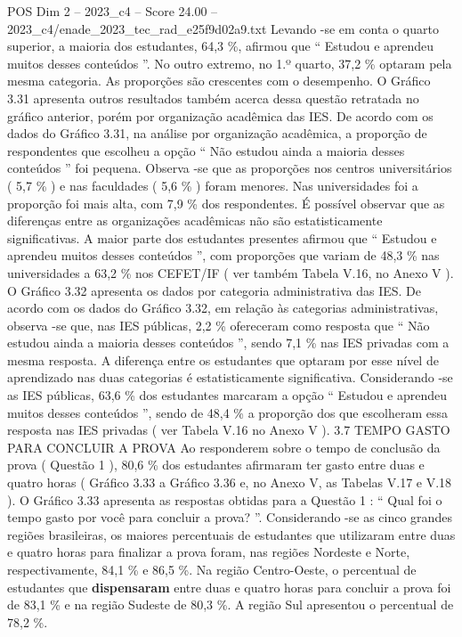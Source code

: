 \begin{textsample}{POS Dim 2 – 2023\_c4 – Score 24.00 – 2023\_c4/enade\_2023\_tec\_rad\_e25f9d02a9.txt}
Levando -se em conta o quarto superior, a maioria dos estudantes, 64,3 \%, afirmou que “ Estudou e aprendeu muitos desses conteúdos ”.
No outro extremo, no 1.º quarto, 37,2 \% optaram pela mesma categoria.
As proporções são crescentes com o desempenho.
O Gráfico 3.31 apresenta outros resultados também acerca dessa questão retratada no gráfico anterior, porém por organização acadêmica das IES.
De acordo com os dados do Gráfico 3.31, na análise por organização acadêmica, a proporção de respondentes que escolheu a opção “ Não estudou ainda a maioria desses conteúdos ” foi pequena.
Observa -se que as proporções nos centros universitários ( 5,7 \% ) e nas faculdades ( 5,6 \% ) foram menores.
Nas universidades foi a proporção foi mais alta, com 7,9 \% dos respondentes.
É possível observar que as diferenças entre as organizações acadêmicas não são estatisticamente significativas.
A maior parte dos estudantes presentes afirmou que “ Estudou e aprendeu muitos desses conteúdos ”, com proporções que variam de 48,3 \% nas universidades a 63,2 \% nos CEFET/IF ( ver também Tabela V.16, no Anexo V ).
O Gráfico 3.32 apresenta os dados por categoria administrativa das IES.
De acordo com os dados do Gráfico 3.32, em relação às categorias administrativas, observa -se que, nas IES públicas, 2,2 \% ofereceram como resposta que “ Não estudou ainda a maioria desses conteúdos ”, sendo 7,1 \% nas IES privadas com a mesma resposta.
A diferença entre os estudantes que optaram por esse nível de aprendizado nas duas categorias é estatisticamente significativa.
Considerando -se as IES públicas, 63,6 \% dos estudantes marcaram a opção “ Estudou e aprendeu muitos desses conteúdos ”, sendo de 48,4 \% a proporção dos que escolheram essa resposta nas IES privadas ( ver Tabela V.16 no Anexo V ). 3.7 TEMPO GASTO PARA CONCLUIR A PROVA Ao responderem sobre o tempo de conclusão da prova ( Questão 1 ), 80,6 \% dos estudantes afirmaram ter gasto entre duas e quatro horas ( Gráfico 3.33 a Gráfico 3.36 e, no Anexo V, as Tabelas V.17 e V.18 ).
O Gráfico 3.33 apresenta as respostas obtidas para a Questão 1 : “ Qual foi o tempo gasto por você para concluir a prova? ”.
Considerando -se as cinco grandes regiões brasileiras, os maiores percentuais de estudantes que utilizaram entre duas e quatro horas para finalizar a prova foram, nas regiões Nordeste e Norte, respectivamente, 84,1 \% e 86,5 \%.
Na região Centro-Oeste, o percentual de estudantes que \textbf{dispensaram} entre duas e quatro horas para concluir a prova foi de 83,1 \% e na região Sudeste de 80,3 \%.
A região Sul apresentou o percentual de 78,2 \%.

\end{textsample}
